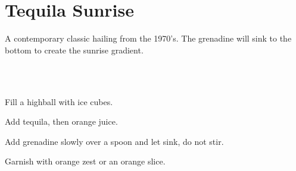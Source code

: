 \section[Tequila Sunrise]{Tequila Sunrise~}


\begin{recipestats}[
	servings=1,
	preptime=5~\minute,
	original=\citeauthor{ibaTequilaSunrise}~\cite{ibaTequilaSunrise},
]
\end{recipestats}

\begin{recipeabstract}
	A contemporary classic hailing from the 1970's.
	The grenadine will sink to the bottom to create the sunrise gradient.
\end{recipeabstract}


\begin{ingredientcolumns}[1]
	\begin{ingredientblock}
		\\
		\\
	\end{ingredientblock}
\end{ingredientcolumns}


\begin{preparation}
\item Fill a highball with ice cubes.
\item Add tequila, then orange juice.
\item Add grenadine slowly over a spoon and let sink, do not stir.
\item Garnish with orange zest or an orange slice.
\end{preparation}


\recipeend%
